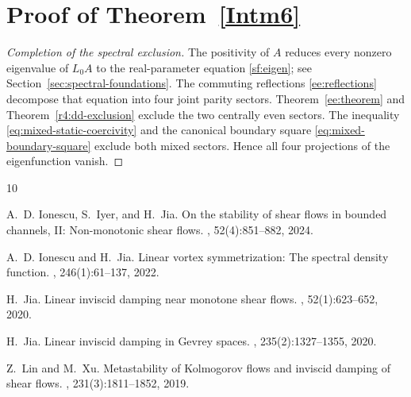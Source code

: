 \documentclass[reqno,11pt]{amsart}
\numberwithin{equation}{section}
\theoremstyle{remark}
\begin{document}
\section{\texorpdfstring{Proof of Theorem~\ref{Intm6}}{Proof of the main theorem}}
\label{sec:spectral-exclusion}

\begin{proof}[Completion of the spectral exclusion]
The positivity of $A$ reduces every nonzero eigenvalue of $L_0A$
to the real-parameter equation \eqref{sf:eigen}; see
Section~\ref{sec:spectral-foundations}. The commuting
reflections \eqref{ee:reflections} decompose that equation into four
joint parity sectors. Theorem~\ref{ee:theorem} and
Theorem~\ref{r4:dd-exclusion} exclude the two centrally even sectors.
The inequality \eqref{eq:mixed-static-coercivity} and the canonical
boundary square \eqref{eq:mixed-boundary-square} exclude both mixed sectors. Hence all four projections
of the eigenfunction vanish.
\end{proof}
\begin{thebibliography}{10}

A.~D. Ionescu, S.~Iyer, and H.~Jia.
\newblock On the stability of shear flows in bounded channels, {II}:
  Non-monotonic shear flows.
, 52(4):851--882, 2024.

A.~D. Ionescu and H.~Jia.
\newblock Linear vortex symmetrization: The spectral density function.
, 246(1):61--137,
  2022.

H.~Jia.
\newblock Linear inviscid damping near monotone shear flows.
,
  52(1):623--652, 2020.

H.~Jia.
\newblock Linear inviscid damping in {Gevrey} spaces.
, 235(2):1327--1355,
  2020.

Z.~Lin and M.~Xu.
\newblock Metastability of {Kolmogorov} flows and inviscid damping of shear
  flows.
, 231(3):1811--1852,
  2019.

\end{thebibliography}
\end{document}
